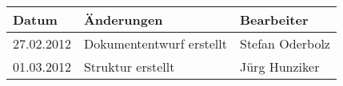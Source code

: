\begin{tabular}{|l|l|l|}
\hline 
Datum & Änderungen & Bearbeiter \\ 
\hline 
27.02.2012 & Dokumententwurf erstellt & Stefan Oderbolz \\ 
\hline 
01.03.2012 & Struktur erstellt & Jürg Hunziker \\ 
\hline 
\end{tabular} 
